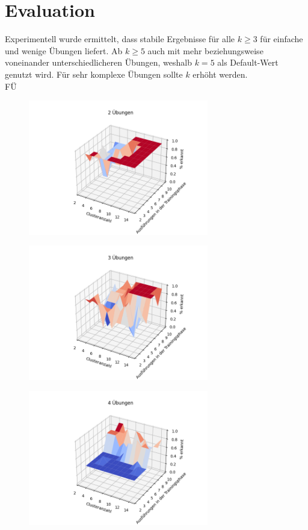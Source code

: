 \documentclass{article}
\begin{document}
\section{Evaluation}

Experimentell wurde ermittelt, dass stabile Ergebnisse für alle $k \geq 3$  für einfache und wenige Übungen liefert.
Ab $k \geq 5$ auch mit mehr beziehungsweise voneinander unterschiedlicheren Übungen, weshalb $k = 5$ als Default-Wert genutzt wird.
Für sehr komplexe Übungen sollte $k$ erhöht werden.\\
FÜ
\begin{figure}[htbp]
\centering
\includegraphics[width=0.7\textwidth]{figures/2_graph.png}
\end{figure}

\begin{figure}[htbp]
\centering
\includegraphics[width=0.7\textwidth]{figures/3_graph.png}
\end{figure}

\begin{figure}[htbp]
\centering
\includegraphics[width=0.7\textwidth]{figures/4_graph.png}
\end{figure}
\end{document}
